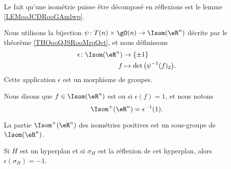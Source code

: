 Le fait qu'une isométrie puisse être décomposé en réflexions est le lemme \ref{LEMooJCDRooGAmlwp}.

\begin{propositionDef}      \label{DEFooOKGSooUhDIfu} \label{DEFooUZFHooXVVLBL}
	Nous utilisons la bijection \( \psi\colon T(n)\times \gO(n)\to \Isom(\eR^n)\) décrite par le théorème \ref{THOooQJSRooMrqQct}, et nous définissons
	\begin{equation}
		\begin{aligned}
			\epsilon\colon \Isom(\eR^n) & \to \{ \pm 1 \}                         \\
			f                           & \mapsto \det\big( \psi^{-1}(f)_2 \big).
		\end{aligned}
	\end{equation}
	Cette application \( \epsilon\) est un morphisme de groupes.


	Nous disons que \( f\in\Isom(\eR^n)\) est  ou  si \( \epsilon(f)=1\), et nous notons
	\begin{equation}
		\Isom^+(\eR^n)=\epsilon^{-1}(1).
	\end{equation}
\end{propositionDef}

\begin{lemma}       \label{LEMooVRELooESIWQl}
	La partie \( \Isom^+(\eR^n)\) des isométries positives est un sous-groupe de \( \Isom(\eR^n)\).
\end{lemma}

\begin{lemma}    \label{LEMooJABDooOKHwWv}
	Si \( H\) est un hyperplan et si \( \sigma_{H}\) est la réflexion de cet hyperplan, alors \( \epsilon(\sigma_H)=-1\).
\end{lemma}

